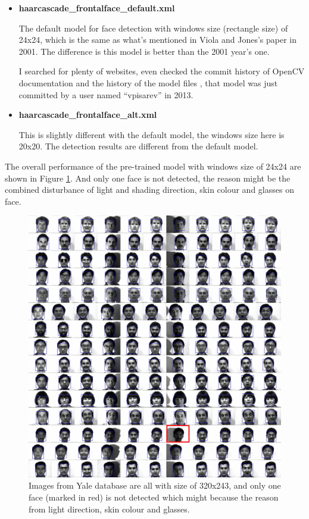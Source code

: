\documentclass[10pt,twocolumn,letterpaper]{article}
\begin{document}
\begin{itemize}
    \item \textbf{haarcascade\_frontalface\_default.xml}

          The default model for face detection with windows size (rectangle size) of 24x24, which is the same as what's mentioned in Viola and Jones's paper in 2001.
          The difference is this model is better than the 2001 year's one.

          I searched for plenty of websites, even checked the commit history of OpenCV documentation \cite{opencvdochistory}
          and the history of the model files \cite{opencvmodelhistory}, that model was just committed by a user named ``vpisarev'' in 2013.

    \item \textbf{haarcascade\_frontalface\_alt.xml}

          This is slightly different with the default model, the windows size here is 20x20. The detection results are different from the default model.

\end{itemize}

The overall performance of the pre-trained model with windows size of 24x24 are shown in Figure \ref{fig:overall}.
And only one face is not detected, the reason might be the combined disturbance of light and shading direction, skin colour and glasses on face.

\begin{figure}[t]
    \begin{center}
        \includegraphics[width=0.9\linewidth]{yaleall}
    \end{center}
    \caption{Images from Yale database \cite{yaleimages} are all with size of 320x243, and only one face (marked in red) is not detected which might
    because the reason from light direction, skin colour and glasses.}
    \label{fig:overall}
\end{figure}
\end{document}
